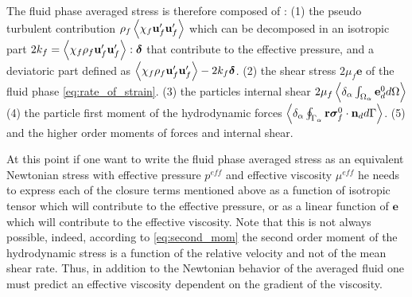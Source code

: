 The fluid phase averaged stress is therefore composed of : 
(1) the pseudo turbulent contribution $\rho_f\left<\chi_f  \textbf{u}_f' \textbf{u}_f'\right>$ which can be decomposed in an isotropic part $2 k_f = \left<\chi_f \rho_f \textbf{u}_f' \textbf{u}_f'\right>:\bm\delta$ that contribute to the effective pressure, and a deviatoric part defined as $\left<\chi_f \rho_f \textbf{u}_f' \textbf{u}_f'\right> - 2 k_f\bm\delta$. 
(2) the shear stress $2\mu_f \textbf{e}$ of the fluid phase \ref{eq:rate_of_strain}. 
(3) the particles internal shear $2\mu_f \left<\delta_\alpha \int_{\Omega_\alpha} \textbf{e}_d^0 d\Omega\right>$
(4) the particle first moment of the hydrodynamic forces $\left<\delta_\alpha \oint_{\Gamma_\alpha} \textbf{r}\bm{\sigma}_f^0\cdot \textbf{n}_d d\Gamma\right>$. 
(5) and the higher order moments of forces and internal shear.  

At this point if one want to write the fluid phase averaged stress as an equivalent Newtonian stress with effective pressure $p^{eff}$ and effective viscosity $\mu^{eff}$ he needs to express each of the closure terms mentioned above as a function of isotropic tensor which will contribute to the effective pressure, or as a linear function of  $\textbf{e}$ which will contribute to the effective viscosity. 
Note that this is not always possible, indeed, according to \ref{eq:second_mom} the second order moment of the hydrodynamic stress is a function of the relative velocity and not of the mean shear rate. 
Thus, in addition to the Newtonian behavior of the averaged fluid one must predict an effective viscosity dependent on the gradient of the viscosity. 

